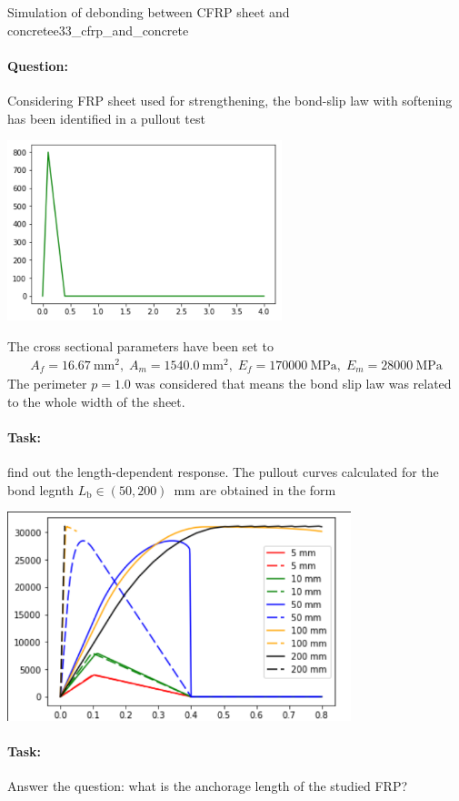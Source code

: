 \documentclass[main.tex]{subfiles}
\begin{document}
\begin{bmcsex}{Simulation of debonding between CFRP sheet and concrete}{e33_cfrp_and_concrete}
\paragraph{Question:} Considering FRP sheet used for strengthening, the bond-slip law with softening has been identified in a pullout test  \\
\begin{center}
\includegraphics[width=8cm]{fig/Lecture03/bond_slip_frp_test.png}
\end{center}
The cross sectional parameters have been set to
\begin{align}
\nonumber
A_f = 16.67~\mathrm{mm}^2, \;
A_m = 1540.0~\mathrm{mm}^2, \;
E_f = 170000~\mathrm{MPa}, \;
E_m = 28000~\mathrm{MPa}
\end{align}
The perimeter $p = 1.0$ was considered that means the bond slip law was related to the whole width of the sheet.
\paragraph{Task:}
find out the length-dependent response. The pullout curves calculated for the bond legnth $L_\mathrm{b} \in (50,200)$~mm are obtained in the form\\
\begin{center}
\includegraphics[width=10cm]{fig/Lecture03/pullout_frp_test.png}
\end{center}
\paragraph{Task:}
Answer the question: what is the anchorage length of the studied FRP?
\end{bmcsex}
\end{document}
